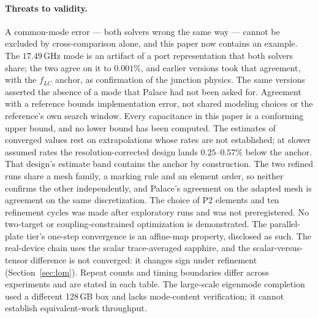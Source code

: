 \documentclass{anvil-paper}
\begin{document}
\paragraph{Threats to validity.}
A common-mode error --- both solvers wrong the same way --- cannot be
excluded by cross-comparison alone, and this paper now contains an
example. The $17.49$\,GHz mode is an artifact of a port representation
that both solvers share; the two agree on it to $0.001\%$, and earlier
versions took that agreement, with the $f_{LC}$ anchor, as confirmation
of the junction physics. The same versions asserted the absence of a
mode that Palace had not been asked for. Agreement with a reference
bounds implementation error, not shared modeling choices or the
reference's own search window. Every capacitance in this paper is a
conforming upper bound, and no lower bound has been computed. The
estimates of converged values rest on extrapolations whose rates are
not established; at slower assumed rates the resolution-corrected
design lands $0.25$--$0.57\%$ below the anchor. That design's estimate
band contains the anchor by construction. The two refined runs share a
mesh family, a marking rule and an element order, so neither confirms
the other independently, and Palace's agreement on the adapted mesh is
agreement on the same discretization. The choice of P2 elements and ten
refinement cycles was made after exploratory runs and was not
preregistered. No two-target or coupling-constrained optimization is
demonstrated. The
parallel-plate tier's one-step convergence is an affine-map property,
disclosed as such. The real-device chain uses the scalar trace-averaged
sapphire, and the scalar-versus-tensor difference is not converged: it
changes sign under refinement (Section~\ref{sec:lom}).
Repeat counts and timing boundaries differ across experiments and are
stated in each table. The large-scale eigenmode completion used a
different 128\,GB box and lacks mode-content verification; it cannot
establish equivalent-work throughput.
\end{document}
